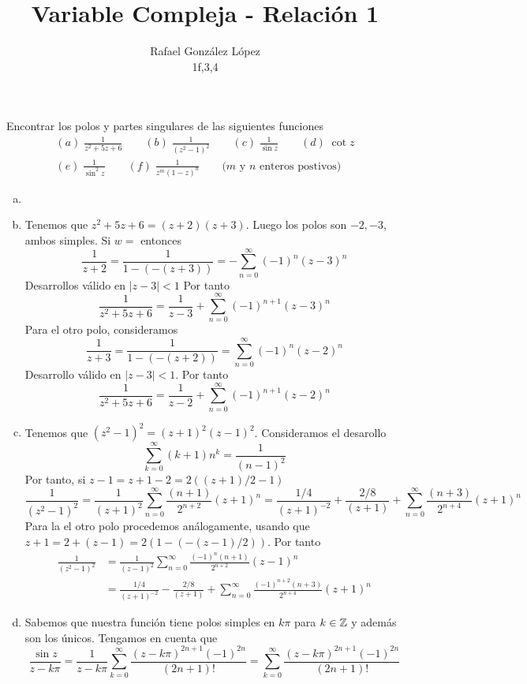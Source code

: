\documentclass[twoside]{article}
\begin{document}
\title{Variable Compleja - Relación 1}
\author{Rafael González López\\
1f,3,4}
\maketitle
\begin{ejercicio}{1}
Encontrar los polos y partes singulares de las siguientes funciones
\begin{gather*}
(a)\; \frac{1}{z^2+5z+6} \qquad (b)\; \frac{1}{(z^2-1)^2} \qquad (c)\; \frac{1}{\sin z} \qquad (d)\; \cot z\\
(e)\; \frac{1}{\sin^2 z}\qquad (f)\; \frac{1}{z^m(1-z)^n} \qquad\text{($m$ y $n$ enteros postivos)}
\end{gather*}
\end{ejercicio}
\begin{solucion}
\begin{enumerate}[(a)]
\item[]
\item Tenemos que $z^2+5z+6=(z+2)(z+3)$. Luego los polos son $-2,-3$, ambos simples. Si $w=$ entonces
$$
\frac{1}{z+2}=\frac{1}{1-(-(z+3))} = - \sum_{n=0}^\infty (-1)^n(z-3)^n
$$
Desarrollos válido en $|z-3|<1$ Por tanto
$$
\frac{1}{z^2+5z+6} = \frac{1}{z-3} + \sum_{n=0}^\infty (-1)^{n+1}(z-3)^n
$$
Para el otro polo, consideramos
$$
\frac{1}{z+3} = \frac{1}{1-(-(z+2))} = \sum_{n=0}^\infty (-1)^n(z-2)^n
$$
Desarrollo válido en $|z-3|<1$. Por tanto
$$
\frac{1}{z^2+5z+6} = \frac{1}{z-2} + \sum_{n=0}^\infty (-1)^{n+1}(z-2)^n
$$
\newpage
\item Tenemos que $(z^2-1)^2 = (z+1)^2(z-1)^2$. Consideramos el desarollo
$$
\sum_{k=0}^\infty (k+1)n^k = \frac{1}{(n-1)^2}
$$
Por tanto, si $z-1 = z+1 -2 = {2((z+1)/2-1)}$
$$\frac{1}{(z^2-1)^2}=  \frac{1}{(z+1)^2} \sum_{n=0}^\infty\frac{(n+1)}{2^{n+2}}(z+1)^n = \frac{1/4}{(z+1)^{-2}}+\frac{2/8}{(z+1)} + \sum_{n=0}^\infty \frac{(n+3)}{2^{n+4}}(z+1)^{n} 
$$
Para la el otro polo procedemos análogamente, usando que $z+1=2+(z-1) = 2(1-(-(z-1)/2))$. Por tanto
\begin{align*}
\frac{1}{(z^2-1)^2}&=  \frac{1}{(z-1)^2} \sum_{n=0}^\infty\frac{(-1)^n(n+1)}{2^{n+2}}(z-1)^n\\
&= \frac{1/4}{(z+1)^{-2}}-\frac{2/8}{(z+1)} + \sum_{n=0}^\infty \frac{(-1)^{n+2}(n+3)}{2^{n+4}}(z+1)^{n}
\end{align*}
\item Sabemos que nuestra función tiene polos simples en $k\pi$ para $k\in \mathbb{Z}$ y además son los únicos.
Tengamos en cuenta que
$$\frac{\sin z}{z-k\pi} = \frac{1}{z-k\pi}\sum_{k=0}^\infty \frac{(z-k\pi)^{2n+1}(-1)^{2n}}{(2n+1)!} = \sum_{k=0}^\infty \frac{(z-k\pi)^{2n+1}(-1)^{2n}}{(2n+1)!} $$

\end{enumerate}
\end{solucion}
\end{document}
